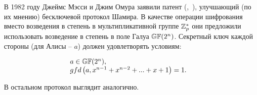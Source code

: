 В 1982 году Джеймс Мэсси и Джим Омура заявили патент (,~\cite{Massey:Omura:1986}), улучшающий (по их мнению) бесключевой протокол Шамира. В качестве операции шифрования вместо возведения в степень в мультипликативной группе $\mathbb{Z}_p^*$ они предложили использовать возведение в степень в поле Галуа $\mathbb{GF}(2^n)$. Секретный ключ каждой стороны (для Алисы -- $a$) должен удовлетворять условиям:

\[ \begin{array}{l}
 a \in \mathbb{GF}(2^n), \\
 gfd \left( a, x^{ n-1 } + x^{ n-2 } + ... + x + 1 \right) = 1. \\
\end{array} \]

В остальном протокол выглядит аналогично.

